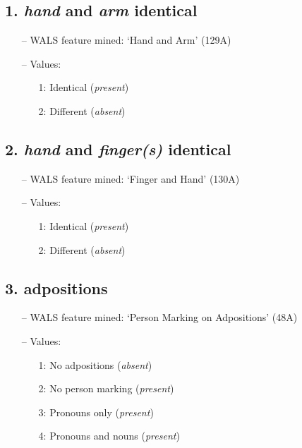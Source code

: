 \subsection*{1. \emph{hand} and \emph{arm} identical}

\begin{itemize}
\item[--] WALS feature mined: `Hand and Arm' (129A)
\item[--] Values:

\begin{enumerate}
\item[1:] Identical (\emph{present})
\item[2:] Different (\emph{absent})
\end{enumerate}
\end{itemize}

\subsection*{2. \emph{hand} and \emph{finger(s)} identical}

\begin{itemize}
\item[--] WALS feature mined: `Finger and Hand' (130A)
\item[--] Values:

\begin{enumerate}
\item[1:] Identical (\emph{present})
\item[2:] Different (\emph{absent})
\end{enumerate}
\end{itemize}

\subsection*{3. adpositions}

\begin{itemize}
\item[--] WALS feature mined: `Person Marking on Adpositions' (48A)
\item[--] Values:

\begin{enumerate}
\item[1:] No adpositions (\emph{absent})
\item[2:] No person marking (\emph{present})
\item[3:] Pronouns only (\emph{present})
\item[4:] Pronouns and nouns (\emph{present})
\end{enumerate}
\end{itemize}

